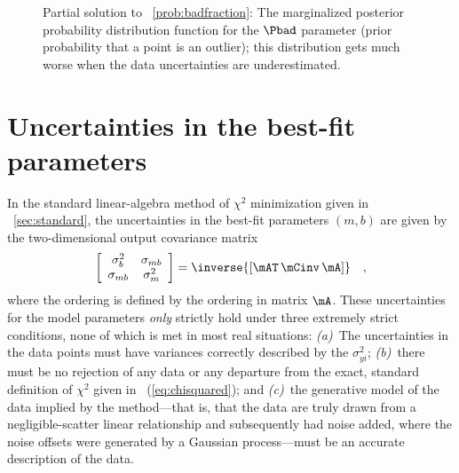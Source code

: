 \documentclass[12pt,twoside,pdftex]{article}
\begin{document}
\begin{figure}[htbp]
\caption{Partial solution to \problemname~\ref{prob:badfraction}: The
marginalized posterior probability distribution function for the
$\Pbad$ parameter (prior probability that a point is an outlier); this
distribution gets much worse when the data uncertainties are
underestimated.}\label{fig:badfraction}
\end{figure}

\section{Uncertainties in the best-fit parameters}\label{sec:uncertainty}

In the standard linear-algebra method of $\chi^2$ minimization given
in \sectionname~\ref{sec:standard}, the uncertainties in the best-fit
parameters $(m,b)$ are given by the two-dimensional output covariance
matrix
\begin{equation}
\left[\begin{array}{cc}
\sigma_{b}^2 & \sigma_{mb} \\
\sigma_{mb} & \sigma_{m}^2
\end{array}\right] = \inverse{\left[\mAT\,\mCinv\,\mA\right]} \quad ,
\end{equation}
where the ordering is defined by the ordering in matrix $\mA$.  These
uncertainties for the model parameters \emph{only} strictly hold under
three extremely strict conditions, none of which is met in most real
situations: \textsl{(a)}~The uncertainties in the data points must
have variances correctly described by the $\sigma_{yi}^2$;
\textsl{(b)}~there must be no rejection of any data or any departure
from the exact, standard definition of $\chi^2$ given in
\equationname~(\ref{eq:chisquared}); and \textsl{(c)}~the generative
model of the data implied by the method---that is, that the data are
truly drawn from a negligible-scatter linear relationship and
subsequently had noise added, where the noise offsets were generated
by a Gaussian process---must be an accurate description of the data.
\end{document}
